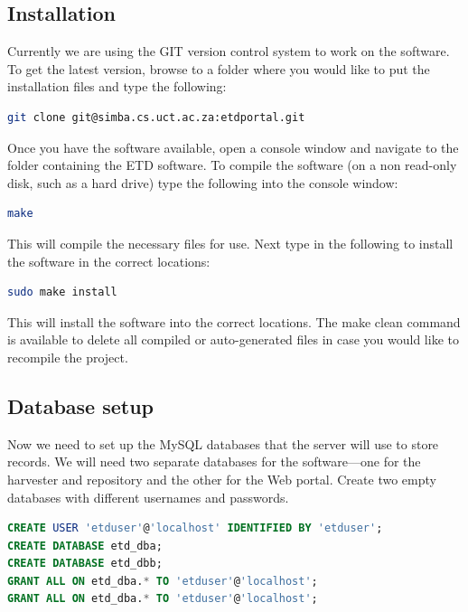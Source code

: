 \documentclass[a4paper,11pt]{article}
\begin{document}
\subsection{Installation}
\label{sec:installation_process:installation}

Currently we are using the GIT version control system to work on the software. To get the latest version, browse to a folder where you would like to put the installation files and type the following:

\begin{lstlisting}[language=bash]
git clone git@simba.cs.uct.ac.za:etdportal.git 
\end{lstlisting}

Once you have the software available, open a console window and navigate to the folder containing the ETD software. To compile the software (on a non read-only disk, such as a hard drive) type the following into the console window: 

\begin{lstlisting}[language=bash]
 make
\end{lstlisting}

This will compile the necessary files for use. Next type in the following to install the software in the correct locations: 

\begin{lstlisting}[language=bash]
 sudo make install
\end{lstlisting}

This will install the software into the correct locations. The make clean command is available to delete all compiled or auto-generated files in case you would like to recompile the project.

\subsection{Database setup}
\label{sec:installation_process:database_setup}

Now we need to set up the MySQL databases that the server will use to store records. We will need two separate databases for the software---one for the harvester and repository and the other for the Web portal. Create two empty databases with different usernames and passwords. 

\begin{lstlisting}[language=SQL]
CREATE USER 'etduser'@'localhost' IDENTIFIED BY 'etduser'; 
CREATE DATABASE etd_dba; 
CREATE DATABASE etd_dbb; 
GRANT ALL ON etd_dba.* TO 'etduser'@'localhost';
GRANT ALL ON etd_dba.* TO 'etduser'@'localhost';
\end{lstlisting}
\end{document}
